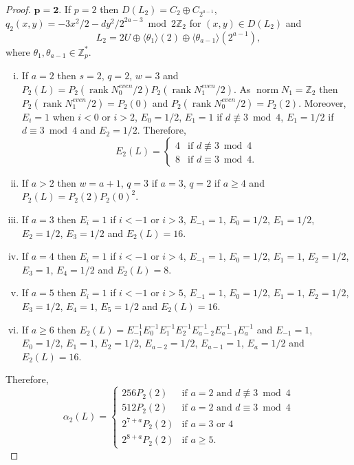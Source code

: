\documentclass[12pt, a4paper]{article}
\newcommand{\ZZ}{\mathbb{Z}}
\newcommand{\la}{\langle}
\newcommand{\ra}{\rangle}
\newcommand{\opn}{\operatorname}
\newcommand{\op}{\oplus}
\begin{document}
\begin{proof}
  \noindent $\mathbf{p=2.}$
  If $p=2$ then $D(L_2)=C_2 \op C_{2^{a-1}}$, $q_2(x,y) = -3x^2/2 - dy^2 / 2^{2a-3} \bmod{ 2 \ZZ_2}$ for $(x,y) \in D(L_2)$ and
  \[
  L_2 = 2U \op \la \theta_1 \ra (2) \op \la \theta_{a-1} \ra (2^{a-1}), 
  \]
  where $\theta_1, \theta_{a-1} \in \ZZ_p^*$.
  \begin{enumerate}[(i)]
  \item  If $a=2$ then $s=2$, $q=2$, $w=3$ and $P_2(L) = P_2( \opn{rank} N_0^{even}/2) P_2( \opn{rank} N_1^{even}/2)$.
  As $\opn{norm} N_1 = \ZZ_2$ then $P_2(\opn{rank} N_1^{even}/2) = P_2(0)$ and $P_2( \opn{rank} N_0^{even}/2) = P_2(2)$.
  Moreover, $E_i=1$ when $i<0$ or $i>2$,
  $E_0 = 1/2$, 
  $E_1 = 1$ if $d \not \equiv 3 \bmod{ 4}$,
  $E_1 = 1/2$ if $d \equiv 3 \bmod{ 4}$
  and $E_2=1/2$. 
  Therefore,
  \[
    E_2(L) = 
    \begin{cases}
      4 & \text{if $d \not \equiv 3 \bmod{ 4}$} \\
      8 & \text{if $d \equiv 3 \bmod{ 4}$}.
    \end{cases}
  \]
\item
  If $a>2$ then
  $w=a+1$, 
  $q=3$ if $a=3$, 
  $q=2$ if $a \geq 4$   
  and
  $P_2(L) = P_2(2) P_2(0)^2$.
  \item If $a=3$ then $E_{i} = 1$ if $i<-1$ or $i>3$,
  $E_{-1} = 1$,
  $E_0 = 1/2$,
  $E_1 = 1/2$,
  $E_2 = 1/2$,
  $E_3 = 1/2$ 
  and $E_2(L) = 16$.
  \item If $a=4$ then $E_{i} = 1$ if $i<-1$ or $i>4$,
  $E_{-1} = 1$, 
  $E_0 = 1/2$, 
  $E_1 = 1$, 
  $E_2 = 1/2$, 
  $E_3 = 1$,
  $E_4 = 1/2$  
  and $E_2(L) = 8$.
  \item If $a=5$ then $E_{i} = 1$ if $i<-1$ or $i>5$,
  $E_{-1} = 1$, 
  $E_0 = 1/2$, 
  $E_1 = 1$, 
  $E_2 = 1/2$, 
  $E_3 = 1/2$, 
  $E_4 = 1$, 
  $E_5 = 1/2$  
  and $E_2(L) = 16$.
\item
  If $a \geq 6$ then $E_2(L) = E_{-1}^{-1} E_0^{-1} E_1^{-1} E_2^{-1} E_{a-2}^{-1} E_{a-1}^{-1} E_a^{-1}$ and
  $E_{-1} = 1$, 
  $E_0 = 1/2$, 
  $E_1 = 1$, 
  $E_2 = 1/2$, 
  $E_{a-2} = 1/2$,  
  $E_{a-1} = 1 $, 
  $E_a = 1/2$  
  and $E_2(L) = 16$.
\end{enumerate}
  Therefore,
  \begin{equation}\label{alpha_2L}
    \alpha_2(L) =
    \begin{cases}
      256 P_2(2) & \text{if $a=2$ and $d \not \equiv 3 \bmod{ 4}$} \\
      512 P_2(2) & \text{if $a=2$ and $d \equiv 3 \bmod{ 4}$} \\
      2^{7+a} P_2(2) & \text{if $a=3$ or $4$} \\
      2^{8+a} P_2(2) & \text{if $a \geq 5$}.
    \end{cases}
  \end{equation}
  

\end{proof}
\end{document}
